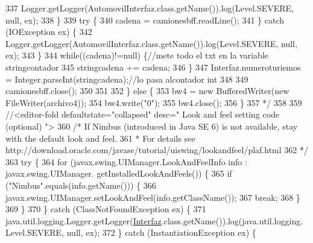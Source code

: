\begin{DoxyCode}
337 \textcolor{comment}{                        Logger.getLogger(AutomovilInterfaz.class.getName()).log(Level.SEVERE, null, ex);}
338 \textcolor{comment}{                    \}}
339 \textcolor{comment}{                    try \{}
340 \textcolor{comment}{                        cadena = camionesbff.readLine();}
341 \textcolor{comment}{                    \} catch (IOException ex) \{}
342 \textcolor{comment}{                        Logger.getLogger(AutomovilInterfaz.class.getName()).log(Level.SEVERE, null, ex);}
343 \textcolor{comment}{                    \}}
344 \textcolor{comment}{                while((cadena)!=null) \{//mete todo el txt en la variable stringcontador}
345 \textcolor{comment}{                        stringcadena += cadena;}
346 \textcolor{comment}{                    \}}
347 \textcolor{comment}{                Interfaz.numeroturismos = Integer.parseInt(stringcadena);//lo pasa alcontador int }
348 \textcolor{comment}{                }
349 \textcolor{comment}{                camionesbff.close();}
350 \textcolor{comment}{                }
351 \textcolor{comment}{            }
352 \textcolor{comment}{        \} else \{}
353 \textcolor{comment}{            bw4 = new BufferedWriter(new FileWriter(archivo4));}
354 \textcolor{comment}{            bw4.write("0");}
355 \textcolor{comment}{            bw4.close();}
356 \textcolor{comment}{        \}}
357 \textcolor{comment}{        */}
358         
359         \textcolor{comment}{//<editor-fold defaultstate="collapsed" desc=" Look and feel setting code (optional) ">}
360         \textcolor{comment}{/* If Nimbus (introduced in Java SE 6) is not available, stay with the default look and feel.}
361 \textcolor{comment}{         * For details see http://download.oracle.com/javase/tutorial/uiswing/lookandfeel/plaf.html }
362 \textcolor{comment}{         */}
363         \textcolor{keywordflow}{try} \{
364             \textcolor{keywordflow}{for} (javax.swing.UIManager.LookAndFeelInfo info : javax.swing.UIManager.
      getInstalledLookAndFeels()) \{
365                 \textcolor{keywordflow}{if} (\textcolor{stringliteral}{"Nimbus"}.equals(info.getName())) \{
366                     javax.swing.UIManager.setLookAndFeel(info.getClassName());
367                     \textcolor{keywordflow}{break};
368                 \}
369             \}
370         \} \textcolor{keywordflow}{catch} (ClassNotFoundException ex) \{
371             java.util.logging.Logger.getLogger(\mbox{\hyperlink{namespace_interfaz}{Interfaz}}.class.getName()).log(java.util.logging.
      Level.SEVERE, null, ex);
372         \} \textcolor{keywordflow}{catch} (InstantiationException ex) \{

\end{DoxyCode}
